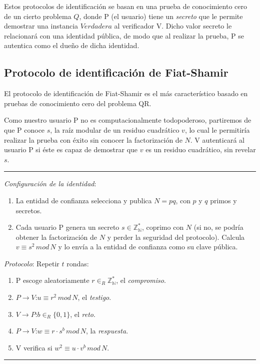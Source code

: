 Estos protocolos de identificación se basan en una prueba de conocimiento cero de un cierto problema $Q$, donde P (el usuario) tiene un \textit{secreto} que le permite demostrar una instancia $Verdadera$ al verificador V. Dicho valor secreto le relacionará con una identidad pública, de modo que al realizar la prueba, P se autentica como el dueño de dicha identidad.


\subsection{Protocolo de identificación de Fiat-Shamir}

El protocolo de identificación de Fiat-Shamir es el más característico basado en pruebas de conocimiento cero del problema QR.

Como nuestro usuario P no es computacionalmente todopoderoso, partiremos de que P conoce $s$, la raíz modular de un residuo cuadrático $v$, lo cual le permitiría realizar la prueba con éxito sin conocer la factorización de $N$. V autenticará al usuario P si éste es capaz de demostrar que $v$ es un residuo cuadrático, sin revelar $s$.


\rule{\textwidth}{1pt}
\begin{algorithm}
	\hfil
	
	\textit{Configuración de la identidad}:
	\begin{enumerate}
		\item La entidad de confianza selecciona y publica $N=pq$, con $p$ y $q$ primos y secretos.
		
		\item Cada usuario P genera un secreto $s \in \mathbb{Z_N^*}$, coprimo con $N$ (si no, se podría obtener la factorización de $N$ y perder la seguridad del protocolo). Calcula $v \equiv s^2 \, mod \, N$ y lo envía a la entidad de confianza como su clave pública.
		
	\end{enumerate}
	
	
	\textit{Protocolo}: Repetir $t$ rondas:
	\begin{enumerate}
		\item P escoge aleatoriamente $r \in_R \mathbb{Z_N^*}$, el \textit{compromiso}.
		\item $P \rightarrow V$:\quad $u \equiv r^2 \, mod \, N$, el \textit{testigo}.
		\item $V \rightarrow P$:\quad $b \in_R \{0,1\}$, el \textit{reto}.
		\item $P \rightarrow V$:\quad $w \equiv r\cdot s^b \, mod \, N$, la \textit{respuesta}.
		\item V verifica si \quad $ w^2 \equiv u\cdot v^b \, mod \, N$.
	\end{enumerate}
	
\end{algorithm}
\rule{\textwidth}{1pt}

